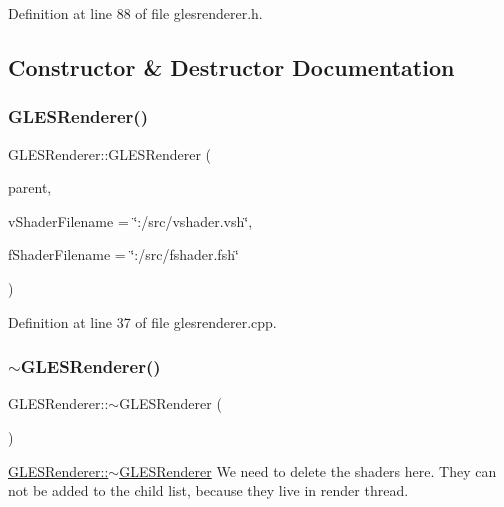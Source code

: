 Definition at line 88 of file glesrenderer.\+h.



\subsection{Constructor \& Destructor Documentation}
\mbox{\label{class_g_l_e_s_renderer_a0c5bf4702ee731dde0377a08b5e15ae2}} 
\subsubsection{\texorpdfstring{GLESRenderer()}{GLESRenderer()}}
{\footnotesize\ttfamily G\+L\+E\+S\+Renderer\+::\+G\+L\+E\+S\+Renderer (\begin{DoxyParamCaption}\item[{Q\+Object $\ast$}]{parent,  }\item[{const Q\+String \&}]{v\+Shader\+Filename = {\ttfamily \char`\"{}\+:/src/vshader.vsh\char`\"{}},  }\item[{const Q\+String \&}]{f\+Shader\+Filename = {\ttfamily \char`\"{}\+:/src/fshader.fsh\char`\"{}} }\end{DoxyParamCaption})\hspace{0.3cm}{\ttfamily [explicit]}}



Definition at line 37 of file glesrenderer.\+cpp.

\mbox{\label{class_g_l_e_s_renderer_aa828ddb16aa0f76409d24369735baa63}} 
\subsubsection{\texorpdfstring{$\sim$GLESRenderer()}{~GLESRenderer()}}
{\footnotesize\ttfamily G\+L\+E\+S\+Renderer\+::$\sim$\+G\+L\+E\+S\+Renderer (\begin{DoxyParamCaption}{ }\end{DoxyParamCaption})\hspace{0.3cm}{\ttfamily [virtual]}}



\mbox{\hyperlink{class_g_l_e_s_renderer_aa828ddb16aa0f76409d24369735baa63}{G\+L\+E\+S\+Renderer\+::$\sim$\+G\+L\+E\+S\+Renderer}} We need to delete the shaders here. They can not be added to the child list, because they live in render thread. 



